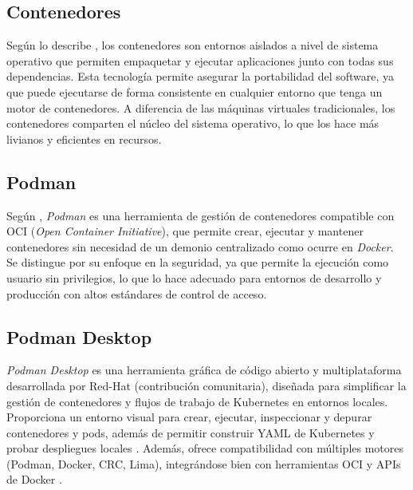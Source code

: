 \documentclass[12pt]{article}
\begin{document}
	\subsection{Contenedores}

	\hspace{1.27cm}Según lo describe \textcite{merkel2014}, los contenedores son entornos aislados a nivel de sistema operativo que permiten empaquetar y ejecutar aplicaciones junto con todas sus dependencias. Esta tecnología permite asegurar la portabilidad del software, ya que puede ejecutarse de forma consistente en cualquier entorno que tenga un motor de contenedores. A diferencia de las máquinas virtuales tradicionales, los contenedores comparten el núcleo del sistema operativo, lo que los hace más livianos y eficientes en recursos.

	\subsection{Podman}

	\hspace{1.27cm}Según \textcite{redhat2021}, \textit{Podman} es una herramienta de gestión de contenedores compatible con OCI (\textit{Open Container Initiative}), que permite crear, ejecutar y mantener contenedores sin necesidad de un demonio centralizado como ocurre en \textit{Docker}. Se distingue por su enfoque en la seguridad, ya que permite la ejecución como usuario sin privilegios, lo que lo hace adecuado para entornos de desarrollo y producción con altos estándares de control de acceso.

	\subsection{Podman Desktop}

	\hspace{1.27cm}\textit{Podman Desktop} es una herramienta gráfica de código abierto y multiplataforma desarrollada por Red-Hat (contribución comunitaria), diseñada para simplificar la gestión de contenedores y flujos de trabajo de Kubernetes en entornos locales. Proporciona un entorno visual para crear, ejecutar, inspeccionar y depurar contenedores y pods, además de permitir construir YAML de Kubernetes y probar despliegues locales \parencite{redhat_podman_desktop,georger2024}. Además, ofrece compatibilidad con múltiples motores (Podman, Docker, CRC, Lima), integrándose bien con herramientas OCI y APIs de Docker \parencite{podman_desktop_multi}.
\end{document}
